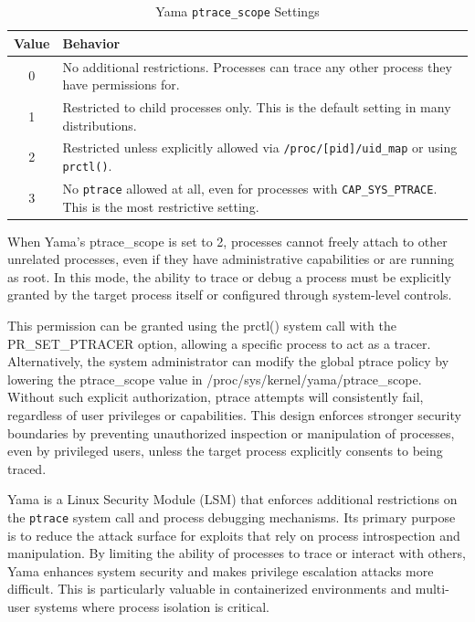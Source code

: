 \documentclass[12pt]{report}
\begin{document}
\begin{doublespace}
\begin{table}[h]
    \centering
    \caption{Yama \texttt{ptrace\_scope} Settings}
    \label{tab:yama-settings}
    \begin{tabular}{|c|p{10cm}|}
        \hline
        \textbf{Value} & \textbf{Behavior} \\
        \hline
        0 & No additional restrictions. Processes can trace any other process they have permissions for. \\
        \hline
        1 & Restricted to child processes only. This is the default setting in many distributions. \\
        \hline
        2 & Restricted unless explicitly allowed via \texttt{/proc/[pid]/uid\_map} or using \texttt{prctl()}. \\
        \hline
        3 & No \texttt{ptrace} allowed at all, even for processes with \texttt{CAP\_SYS\_PTRACE}. This is the most restrictive setting. \\
        \hline
    \end{tabular}
\end{table}

When Yama’s ptrace\_scope is set to 2, processes cannot freely attach to other unrelated processes, even if they have administrative capabilities or are running as root. In this mode, the ability to trace or debug a process must be explicitly granted by the target process itself or configured through system-level controls.

This permission can be granted using the prctl() system call with the PR\_SET\_PTRACER option, allowing a specific process to act as a tracer. Alternatively, the system administrator can modify the global ptrace policy by lowering the ptrace\_scope value in /proc/sys/kernel/yama/ptrace\_scope. Without such explicit authorization, ptrace attempts will consistently fail, regardless of user privileges or capabilities. This design enforces stronger security boundaries by preventing unauthorized inspection or manipulation of processes, even by privileged users, unless the target process explicitly consents to being traced.



Yama is a Linux Security Module (LSM) that enforces additional restrictions on the \texttt{ptrace} system call and process debugging mechanisms. Its primary purpose is to reduce the attack surface for exploits that rely on process introspection and manipulation. By limiting the ability of processes to trace or interact with others, Yama enhances system security and makes privilege escalation attacks more difficult. This is particularly valuable in containerized environments and multi-user systems where process isolation is critical.


\end{doublespace}
\end{document}
